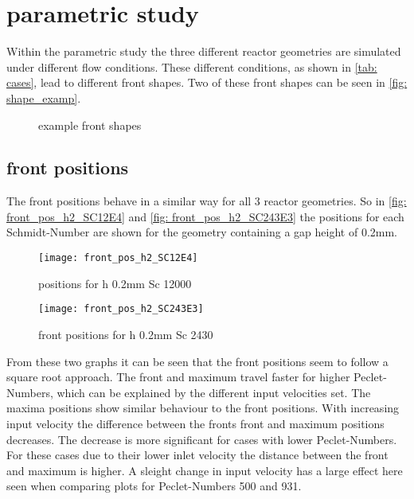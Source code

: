 \documentclass[../thesis.tex]{subfiles}
\begin{document}
\chapter{parametric study}
\label{chp: para_stud}
Within the parametric study the three different reactor geometries are simulated under different flow conditions. These different conditions, as shown in \autoref{tab: cases}, lead to different front shapes. Two of these front shapes can be seen in \autoref{fig: shape_examp}.
\begin{figure}[htb]
	\centering
	\qquad
	\caption{example front shapes}%
	\label{fig: shape_examp}%
\end{figure}

\section{front positions}

The front positions behave in a similar way for all 3 reactor geometries. So in \autoref{fig: front_pos_h2_SC12E4} and \autoref{fig: front_pos_h2_SC243E3} the positions for each Schmidt-Number are shown
for the geometry containing a gap height of 0.2mm.
\begin{figure}[htbp]
	\centering
	\texttt{[image: front\_pos\_h2\_SC12E4]}
	\caption{positions for h 0.2mm Sc 12000\label{fig: front_pos_h2_SC12E4}}\bigskip
	\texttt{[image: front\_pos\_h2\_SC243E3]}
	\caption{front positions for h 0.2mm Sc 2430\label{fig: front_pos_h2_SC243E3}}
\end{figure}

From these two graphs it can be seen that the front positions seem to follow a square root approach. The front and maximum travel faster for higher Peclet-Numbers, which can be explained by the different input velocities set. The maxima positions show similar behaviour to the front positions. With increasing input velocity the difference between the fronts front and maximum positions decreases. The decrease is more significant for cases with lower Peclet-Numbers. For these cases due to their lower inlet velocity the distance between the front and maximum is higher. A sleight change in input velocity has a large effect here seen when comparing plots for Peclet-Numbers 500 and 931.
\end{document}
